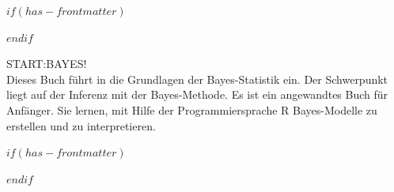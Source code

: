 
$if(has-frontmatter)$
  \begin{frontmatter}
$endif$



\begin{titlepage}
    \centering
    \vspace*{3cm}
    {\Huge START:BAYES!\\}
    \vspace*{2cm}
    \noindent %
Dieses Buch führt in die Grundlagen der Bayes-Statistik ein.
Der Schwerpunkt liegt auf der Inferenz mit der Bayes-Methode.
Es ist ein angewandtes Buch für Anfänger.
Sie lernen, mit Hilfe der Programmiersprache R Bayes-Modelle
zu erstellen und zu interpretieren.

    \vfill
\end{titlepage}


\newpage
\null
\thispagestyle{empty} %
\newpage



\setcounter{page}{1}
$if(has-frontmatter)$
\end{frontmatter}
$endif$


